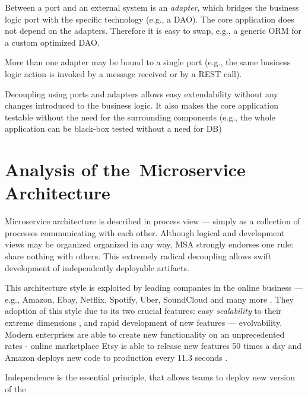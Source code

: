 \documentclass[thesis=M,english,hidelinks]{FITthesis}[2012/10/20]
\begin{document}
Between a port and an external system is an \textit{adapter}, which bridges the business logic port with the specific technology (e.g., a \acrlong{DAO}). The core application does not depend on the adapters. Therefore it is easy to swap, e.g., a generic \acrshort{ORM} for a custom optimized \acrshort{DAO}.

More than one adapter may be bound to a single port (e.g., the same business logic action is invoked by a message received or by a \acrshort{REST} call).

Decoupling using ports and adapters allows easy extendability without any changes introduced to the business logic. It also makes the core application testable without the need for the surrounding components (e.g., the whole application can be black-box tested without a need for \acrshort{DB})

% 
% 

% 
% 

\chapter{Analysis of the~Microservice Architecture}
\label{sec:msa_analysis}

Microservice architecture is described in process view --- simply as a collection of processes communicating with each other. Although logical and development views may be organized organized in any way, \acrshort{MSA} strongly endorses one rule: share nothing with others. This extremely radical decoupling allows swift development of independently deployable artifacts.

This architecture style is exploited by leading companies in the online business --- e.g., Amazon, Ebay, Netflix, Spotify, Uber, SoundCloud and many more \cite{ms-who-is-using}. They adoption of this style due to its two crucial features: easy \textit{scalability} to their extreme dimensions \cite{ms-ebay-scalability-best-practices, ms-ebay-ds-scalability, ms-spotify-horizontal-scaling, ms-spotify}, and rapid development of new features --- evolvability. Modern enterprises are able to create new functionality on an unprecedented rates - online marketplace Etsy is able to release new features 50 times a day and Amazon deploys new code to production every 11.3 seconds \cite{devops-deploying-hourly}.

Independence is the essential principle, that allows teams to deploy new version of the 
\end{document}
